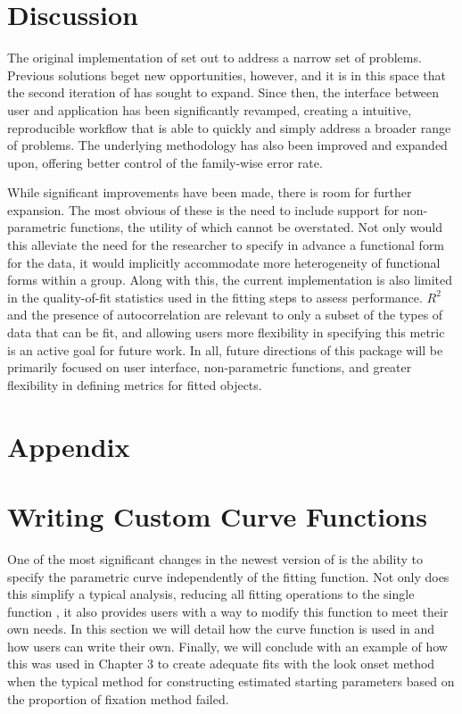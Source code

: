 \section{Discussion}


The original implementation of  set out to address a narrow set of problems. Previous solutions beget new opportunities, however, and it is in this space that the second iteration of  has sought to expand. Since then, the interface between user and application has been significantly revamped, creating a intuitive, reproducible workflow that is able to quickly and simply address a broader range of problems. The underlying methodology has also been improved and expanded upon, offering better control of the family-wise error rate.

While significant improvements have been made, there is room for further expansion. The most obvious of these is the need to include support for non-parametric functions, the utility of which cannot be overstated. Not only would this alleviate the need for the researcher to specify in advance a functional form for the data, it would implicitly accommodate more heterogeneity of functional forms within a group. Along with this, the current implementation is also limited in the quality-of-fit statistics used in the fitting steps to assess performance. $R^2$ and the presence of autocorrelation are relevant to only a subset of the types of data that can be fit, and allowing users more flexibility in specifying this metric is an active goal for future work. In all, future directions of this package will be primarily focused on user interface, non-parametric functions, and greater flexibility in defining metrics for fitted objects.



\section*{Appendix}




\section{Writing Custom Curve Functions}

One of the most significant changes in the newest version of  is the ability to specify the parametric curve independently of the fitting function. Not only does this simplify a typical analysis, reducing all fitting operations to the single function , it also provides users with a way to modify this function to meet their own needs. In this section we will detail how the curve function is used in  and how users can write their own. Finally, we will conclude with an example of how this was used in Chapter 3 to create adequate fits with the  look onset method when the typical method for constructing estimated starting parameters based on the proportion of fixation method failed.

